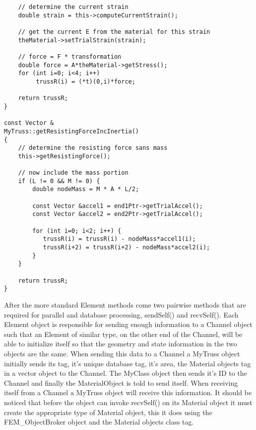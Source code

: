 \documentclass[12pt]{article}
\begin{document}
{\begin{verbatim}
    // determine the current strain
    double strain = this->computeCurrentStrain();

    // get the current E from the material for this strain
    theMaterial->setTrialStrain(strain);

    // force = F * transformation 
    double force = A*theMaterial->getStress();
    for (int i=0; i<4; i++)
         trussR(i) = (*t)(0,i)*force;

    return trussR;
}

const Vector &
MyTruss::getResistingForceIncInertia()
{	
    // determine the resisting force sans mass
    this->getResistingForce();	

    // now include the mass portion
    if (L != 0 && M != 0) {
        double nodeMass = M * A * L/2;

        const Vector &accel1 = end1Ptr->getTrialAccel();
        const Vector &accel2 = end2Ptr->getTrialAccel();	
	
        for (int i=0; i<2; i++) {
           trussR(i) = trussR(i) - nodeMass*accel1(i);
           trussR(i+2) = trussR(i+2) - nodeMass*accel2(i);
        }
    }

    return trussR;    
}
\end{verbatim}}

After the more standard Element methods come two pairwise methods that
are required for parallel and database processing, {\sf sendSelf()}
and {\sf recvSelf()}. Each Element object is responsible for sending
enough information to a Channel object such that an Element of similar type,
on the other end of the Channel, will be able to initialize itself so
that the geometry and state information in the two objects are the same.
When sending this data to a Channel a MyTruss object initially sends
its tag, it's unique database tag, it's area, the Material objects tag
in a vector object to the Channel. The MyClass object then sends it's
ID to the Channel and finally the MaterialObject is told to send itself.
When receiving itself from a Channel a MyTruss object will receive
this information. It should be noticed that before the object can
invoke {\sf recvSelf()} on its Material object it must create the
appropriate type of Material object, this it does using the
FEM\_ObjectBroker object and the Material objects class tag.
\end{document}
